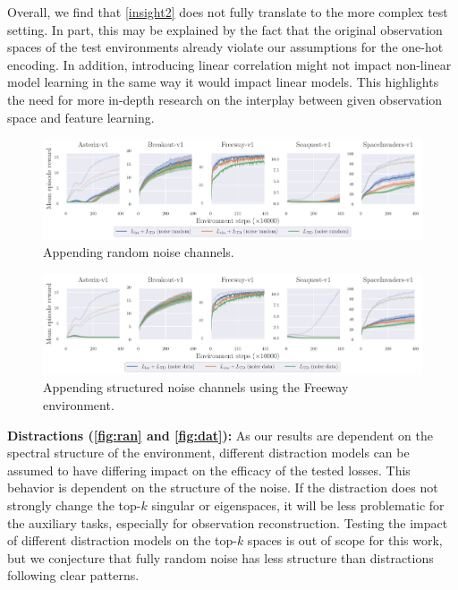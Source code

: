 Overall, we find that \autoref{insight2} does not fully translate to the more complex test setting.
In part, this may be explained by the fact that the original observation spaces of the test environments already violate our assumptions for the one-hot encoding.
In addition, introducing linear correlation might not impact non-linear model learning in the same way it would impact linear models.
This highlights the need for more in-depth research on the interplay between given observation space and feature learning.

\begin{figure}[t]
    \centering
    \includegraphics[width=\textwidth]{figures/understanding/rlc2024-noise-random_minatar.pdf}
    \caption{Appending random noise channels.}
    \label{fig:ran}
\end{figure}

\begin{figure}[t]
    \centering
    \includegraphics[width=\textwidth]{figures/understanding/rlc2024-noise-data_minatar.pdf}
    \caption{Appending structured noise channels using the Freeway environment.}
    \label{fig:dat}
\end{figure}

\textbf{Distractions (\autoref{fig:ran} and \autoref{fig:dat}):}
As our results are dependent on the spectral structure of the environment, different distraction models can be assumed to have differing impact on the efficacy of the tested losses.
This behavior is dependent on the structure of the noise.
If the distraction does not strongly change the top-$k$ singular or eigenspaces, it will be less problematic for the auxiliary tasks, especially for observation reconstruction.
Testing the impact of different distraction models on the top-$k$ spaces is out of scope for this work, but we conjecture that fully random noise has less structure than distractions following clear patterns.

